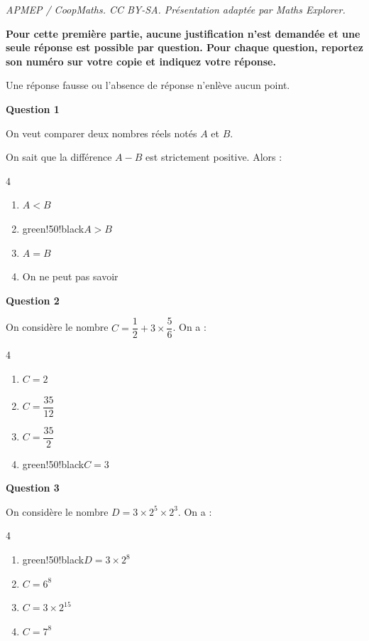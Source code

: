 \documentclass[10pt]{article}
\begin{document}
\noindent\textit{APMEP / CoopMaths. CC BY-SA. Présentation adaptée par Maths Explorer.}\par\medskip
\textbf{Pour cette première partie, aucune justification n'est demandée et une seule réponse est possible par question. Pour chaque question, reportez son numéro sur votre copie et indiquez votre réponse.}

	Une réponse fausse ou l'absence de réponse n'enlève aucun point.

\bigskip

	\textbf{Question 1}

On veut comparer deux nombres réels notés $A$ et $B$.

On sait que la différence $A - B$ est strictement positive. Alors :

\begin{multicols}{4}
\begin{enumerate}[label=\textbf{\alph* .}]
\item $A<B$
\item \begin{color}{green!50!black}$\boxed{A>B}$\end{color}
\item $A=B$
\item On ne peut pas savoir
\end{enumerate}
\end{multicols}

	\textbf{Question 2}

On considère le nombre $C=\dfrac{1}{2}+3\times\dfrac{5}{6}$. On a :

\begin{multicols}{4}
\begin{enumerate}[label=\textbf{\alph* .}]
\item $C = 2$
\item $C = \dfrac{35}{12}$
\item $C = \dfrac{35}{2}$
\item \begin{color}{green!50!black}$\boxed{C = 3}$\end{color}
\end{enumerate}
\end{multicols}

\textbf{Question 3}

On considère le nombre $D=3 \times 2^5 \times 2^3$. On a :

\begin{multicols}{4}
\begin{enumerate}[label=\textbf{\alph* .}]
\item \begin{color}{green!50!black}$\boxed{D = 3\times 2^8}$\end{color}
\item $C = 6^{8}$
\item $C = 3\times 2^{15}$
\item $C = 7^{8}$
\end{enumerate}
\end{multicols}
\end{document}
